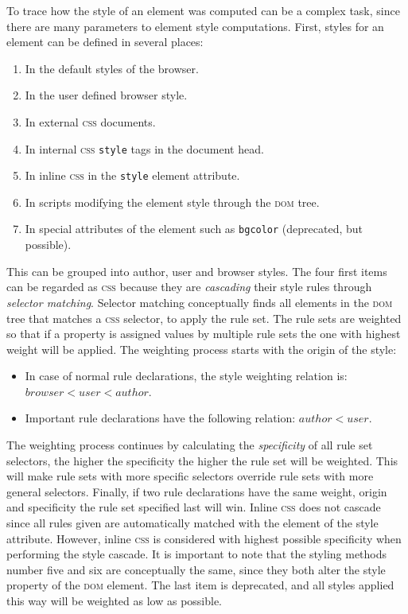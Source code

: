\documentclass[a4paper,11pt]{kth-mag}
\newcommand{\code}[1]{\texttt{#1}}
\begin{document}
        To trace how the style of an element was computed can be a complex task, since there are many parameters to element style computations.
        First, styles for an element can be defined in several places:
        \begin{enumerate}
          \item In the default styles of the browser.
          \item In the user defined browser style.
          \item In external \textsc{css} documents.
          \item In internal \textsc{css} \code{style} tags in the document head.
          \item In inline \textsc{css} in the \code{style} element attribute.
          \item In scripts modifying the element style through the \textsc{dom} tree.
          \item In special attributes of the element such as \code{bgcolor} (deprecated, but possible).
        \end{enumerate}
        This can be grouped into author, user and browser styles.
        The four first items can be regarded as \textsc{css} because they are \emph{cascading} their style rules through \emph{selector matching}.
        Selector matching conceptually finds all elements in the \textsc{dom} tree that matches a \textsc{css} selector, to apply the rule set.
        The rule sets are weighted so that if a property is assigned values by multiple rule sets the one with highest weight will be applied.
        The weighting process starts with the origin of the style:
        \begin{itemize}
          \item In case of normal rule declarations, the style weighting relation is: $browser < user < author$.
          \item Important rule declarations have the following relation: $author < user$.
        \end{itemize}
        The weighting process continues by calculating the \emph{specificity} of all rule set selectors, the higher the specificity the higher the rule set will be weighted.
        This will make rule sets with more specific selectors override rule sets with more general selectors.
        Finally, if two rule declarations have the same weight, origin and specificity the rule set specified last will win.
        Inline \textsc{css} does not cascade since all rules given are automatically matched with the element of the style attribute.
        However, inline \textsc{css} is considered with highest possible specificity when performing the style cascade.
        It is important to note that the styling methods number five and six are conceptually the same, since they both alter the style property of the \textsc{dom} element.
        The last item is deprecated, and all styles applied this way will be weighted as low as possible.
\end{document}
